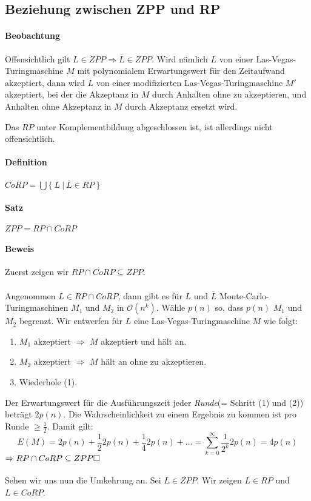 \subsection{Beziehung zwischen ZPP und RP}
\paragraph{Beobachtung}
Offensichtlich gilt $L \in ZPP \Rightarrow \overline{L} \in ZPP$.
Wird nämlich $L$ von einer Las-Vegas-Turingmaschine $M$ mit polynomialem Erwartungswert für den Zeitaufwand akzeptiert, dann wird $L$ von einer modifizierten Las-Vegas-Turingmaschine $M'$ akzeptiert, bei der die Akzeptanz in $M$ durch Anhalten ohne zu akzeptieren, und Anhalten ohne Akzeptanz in $M$ durch Akzeptanz ersetzt wird.

Das $RP$ unter Komplementbildung abgeschlossen ist, ist allerdings nicht offensichtlich.

\paragraph{Definition}
$CoRP = \bigcup \bigl\{\ L\ \bigl\lvert\ \overline{L} \in RP\ \}$

\paragraph{Satz}
$ZPP = RP \cap CoRP$

\paragraph{Beweis}
Zuerst zeigen wir $RP \cap CoRP \subseteq ZPP$.\\
\\
Angenommen $L \in RP \cap CoRP$, dann gibt es für $L$ und $\overline{L}$ Monte-Carlo-Turingmaschinen $M_1$ und $M_2$ in $\mathcal{O}(n^k)$.
Wähle $p(n)$ so, dass $p(n)$ $M_1$ und $M_2$ begrenzt.
Wir entwerfen für $L$ eine Las-Vegas-Turingmaschine $M$ wie folgt:
\begin{enumerate}
	\item $M_1$ akzeptiert $\Rightarrow$ $M$ akzeptiert und hält an.
	\item $M_2$ akzeptiert $\Rightarrow$ $M$ hält an ohne zu akzeptieren.
	\item Wiederhole (1).
\end{enumerate}
Der Erwartungswert für die Ausführungszeit jeder \emph{Runde}(= Schritt (1) und (2)) beträgt $2p(n)$.
Die Wahrscheinlichkeit zu einem Ergebnis zu kommen ist pro Runde $\geq \frac{1}{2}$.
Damit gilt:
\begin{equation*}
	E(M) = 2p(n) + \frac{1}{2}2p(n) + \frac{1}{4}2p(n) + ... = \sum\limits_{k=0}^{\infty}\frac{1}{2^k}2p(n) = 4p(n)
\end{equation*}
$\Rightarrow RP \cap CoRP \subseteq ZPP \hfill \Box$\\
\\
Sehen wir uns nun die Umkehrung an.
Sei $L \in ZPP$.
Wir zeigen $L \in RP$ und $L \in CoRP$.


